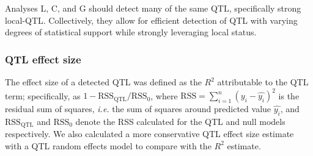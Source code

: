 \documentclass[9pt,twocolumn,twoside]{gsajnl}
\newcommand{\ie}{\emph{i.e.}\xspace}
\newcommand{\WV}[2]{\textcolor{red}{#1\footnote{\textcolor{red}{WV: #2}}}}
\begin{document}
Analyses L, C, and G should detect many of the same QTL, specifically strong local-QTL. Collectively, they allow for efficient detection of QTL with varying degrees of statistical support while strongly leveraging local status.






\subsubsection{QTL effect size}

The effect size of a detected QTL was defined as the $R^2$ attributable to the QTL term; specifically, as $1-\text{RSS}_\text{QTL} / \text{RSS}_0$, where $\text{RSS} = \sum_{i = 1}^{n}(y_{i} - \widehat{y_{i}})^{2}$ is the residual sum of squares, \ie the sum of squares around predicted value $\widehat{y_i}$, and $\text{RSS}_{\text{QTL}}$ and $\text{RSS}_0$ denote the RSS calculated for the QTL and null models respectively. We also calculated a more conservative QTL effect size estimate with a QTL random effects model to compare with the $R^{2}$ estimate.%
\end{document}

